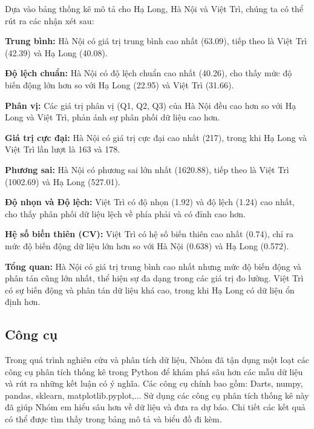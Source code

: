 Dựa vào bảng thống kê mô tả cho Hạ Long, Hà Nội và Việt Trì, chúng ta có thể rút ra các nhận xét sau:

\textbf{Trung bình:} Hà Nội có giá trị trung bình cao nhất (63.09), tiếp theo là Việt Trì (42.39) và Hạ Long (40.08).

\textbf{Độ lệch chuẩn:} Hà Nội có độ lệch chuẩn cao nhất (40.26), cho thấy mức độ biến động lớn hơn so với Hạ Long (22.95) và Việt Trì (31.66).

\textbf{Phân vị:} Các giá trị phân vị (Q1, Q2, Q3) của Hà Nội đều cao hơn so với Hạ Long và Việt Trì, phản ánh sự phân phối dữ liệu cao hơn.

\textbf{Giá trị cực đại:} Hà Nội có giá trị cực đại cao nhất (217), trong khi Hạ Long và Việt Trì lần lượt là 163 và 178.

\textbf{Phương sai:} Hà Nội có phương sai lớn nhất (1620.88), tiếp theo là Việt Trì (1002.69) và Hạ Long (527.01).

\textbf{Độ nhọn và Độ lệch:} Việt Trì có độ nhọn (1.92) và độ lệch (1.24) cao nhất, cho thấy phân phối dữ liệu lệch về phía phải và có đỉnh cao hơn.

\textbf{Hệ số biến thiên (CV):} Việt Trì có hệ số biến thiên cao nhất (0.74), chỉ ra mức độ biến động dữ liệu lớn hơn so với Hà Nội (0.638) và Hạ Long (0.572).

\textbf{Tổng quan:} Hà Nội có giá trị trung bình cao nhất nhưng mức độ biến động và phân tán cũng lớn nhất, thể hiện sự đa dạng trong các giá trị đo lường. Việt Trì có sự biến động và phân tán dữ liệu khá cao, trong khi Hạ Long có dữ liệu ổn định hơn.


\subsection{Công cụ}
Trong quá trình nghiên cứu và phân tích dữ liệu, Nhóm đã tận dụng một loạt các công cụ phân tích thống kê trong Python để khám phá sâu hơn các mẫu dữ liệu và rút ra những kết luận có ý nghĩa. Các công cụ chính bao gồm: Darts, numpy, pandas, sklearn, matplotlib.pyplot,... Sử dụng các công cụ phân tích thống kê này đã giúp Nhóm em hiểu sâu hơn về dữ liệu và đưa ra dự báo. Chi tiết các kết quả có thể được tìm thấy trong bảng mô tả và biểu đồ đi kèm.

